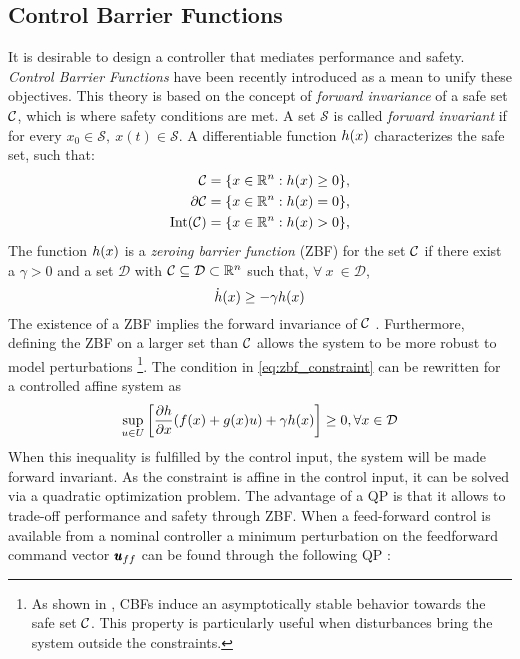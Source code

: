 \subsection{Control Barrier Functions}
It is desirable to design a controller that mediates performance and safety. \emph{Control Barrier Functions} have been recently introduced as a mean to unify these objectives. This theory is based on the concept of \emph{forward invariance} of a safe set $\mathcal{C} $, which is where safety conditions are met. A set $\mathcal{S}$ is called \emph{forward invariant} if for every $x_0 \in \mathcal{S},\ x(t) \in \mathcal{S}$. A differentiable function $h(x)$  characterizes the safe set, such that:
\begin{align*}
    \mathcal{C} &= \{ x \in \mathbb{R}^{n} : h(x) \geq 0 \}, \\
    \partial \mathcal{C} &= \{ x \in \mathbb{R}^{n} : h(x) = 0 \}, \\
    \text{Int}(\mathcal{C}) &= \{ x \in \mathbb{R}^{n} : h(x) > 0 \},
\end{align*}
The function $h(x)$ is a \emph{zeroing barrier function} (ZBF) for the set $ \mathcal{C} $ if there exist a $\gamma > 0$ and a set $\mathcal{D}$ with $\mathcal{C} \subseteq \mathcal{D} \subset \mathbb{R}^{n}$ such that, $\forall \  x \  \in \mathcal{D}$, 
\begin{equation} \label{eq:zbf_constraint}
    \dot{h}(x) \geq -\gamma h(x)
\end{equation}
The existence of a ZBF implies the forward invariance of $\mathcal{C}$ \cite{ames2016control}. Furthermore, defining the ZBF on a larger set than $\mathcal{C}$ allows the system to be more robust to model perturbations \footnote{As shown in \cite{ames2016control}, CBFs induce an asymptotically stable behavior towards the safe set $\mathcal{C}$. This property is particularly useful when disturbances bring the system outside the constraints.}. The condition in \eqn \ref{eq:zbf_constraint} can be rewritten for a controlled affine system as
\begin{equation}
    \sup_{u \in U} \left[ \frac{\partial h }{\partial x} (f(x) + g(x)u) + \gamma h(x) \right] \geq 0, \forall x \in \mathcal{D}
\end{equation}
When this inequality is fulfilled by the control input, the system will be made forward invariant. 
As the constraint is affine in the control input, it can be solved via a quadratic optimization problem. The advantage of a QP is that it allows to trade-off performance and safety through ZBF. When a feed-forward control is available from a nominal controller a minimum perturbation on the feedforward command vector $\pmb{u}_{ff}$ can be found through the following QP \cite{ames2019control}:

